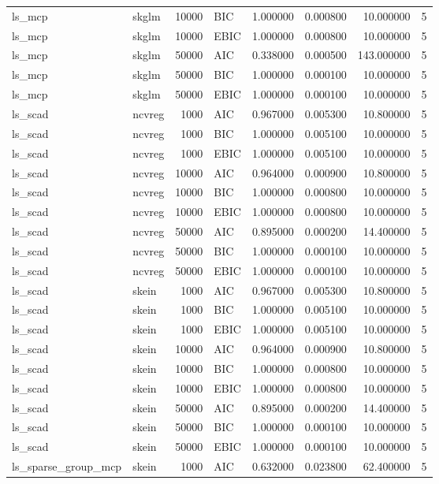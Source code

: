 \begin{table}[t]
\begin{tabular}{llrlrrrr}
ls_mcp & skglm & 10000 & BIC & 1.000000 & 0.000800 & 10.000000 & 5 \\
ls_mcp & skglm & 10000 & EBIC & 1.000000 & 0.000800 & 10.000000 & 5 \\
ls_mcp & skglm & 50000 & AIC & 0.338000 & 0.000500 & 143.000000 & 5 \\
ls_mcp & skglm & 50000 & BIC & 1.000000 & 0.000100 & 10.000000 & 5 \\
ls_mcp & skglm & 50000 & EBIC & 1.000000 & 0.000100 & 10.000000 & 5 \\
ls_scad & ncvreg & 1000 & AIC & 0.967000 & 0.005300 & 10.800000 & 5 \\
ls_scad & ncvreg & 1000 & BIC & 1.000000 & 0.005100 & 10.000000 & 5 \\
ls_scad & ncvreg & 1000 & EBIC & 1.000000 & 0.005100 & 10.000000 & 5 \\
ls_scad & ncvreg & 10000 & AIC & 0.964000 & 0.000900 & 10.800000 & 5 \\
ls_scad & ncvreg & 10000 & BIC & 1.000000 & 0.000800 & 10.000000 & 5 \\
ls_scad & ncvreg & 10000 & EBIC & 1.000000 & 0.000800 & 10.000000 & 5 \\
ls_scad & ncvreg & 50000 & AIC & 0.895000 & 0.000200 & 14.400000 & 5 \\
ls_scad & ncvreg & 50000 & BIC & 1.000000 & 0.000100 & 10.000000 & 5 \\
ls_scad & ncvreg & 50000 & EBIC & 1.000000 & 0.000100 & 10.000000 & 5 \\
ls_scad & skein & 1000 & AIC & 0.967000 & 0.005300 & 10.800000 & 5 \\
ls_scad & skein & 1000 & BIC & 1.000000 & 0.005100 & 10.000000 & 5 \\
ls_scad & skein & 1000 & EBIC & 1.000000 & 0.005100 & 10.000000 & 5 \\
ls_scad & skein & 10000 & AIC & 0.964000 & 0.000900 & 10.800000 & 5 \\
ls_scad & skein & 10000 & BIC & 1.000000 & 0.000800 & 10.000000 & 5 \\
ls_scad & skein & 10000 & EBIC & 1.000000 & 0.000800 & 10.000000 & 5 \\
ls_scad & skein & 50000 & AIC & 0.895000 & 0.000200 & 14.400000 & 5 \\
ls_scad & skein & 50000 & BIC & 1.000000 & 0.000100 & 10.000000 & 5 \\
ls_scad & skein & 50000 & EBIC & 1.000000 & 0.000100 & 10.000000 & 5 \\
ls_sparse_group_mcp & skein & 1000 & AIC & 0.632000 & 0.023800 & 62.400000 & 5 \\

\end{tabular}
\end{table}
